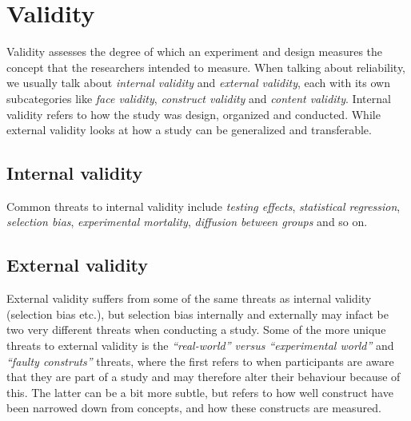 \section{Validity}
	Validity assesses the degree of which an experiment and design measures the concept that the researchers intended to measure.
	When talking about reliability, we usually talk about \textit{internal validity} and \textit{external validity}, each with its own subcategories like \textit{face validity}, \textit{construct validity} and \textit{content validity}.
	Internal validity refers to how the study was design, organized and conducted. While external validity looks at how a study can be generalized and transferable.
	
	\subsection{Internal validity}
	Common threats to internal validity include \textit{testing effects}, \textit{statistical regression}, \textit{selection bias}, \textit{experimental mortality}, \textit{diffusion between groups} and so on. 
	
	\subsection{External validity}
	External validity suffers from some of the same threats as internal validity (selection bias etc.), but selection bias internally and externally may infact be two very different threats when conducting a study.
	Some of the more unique threats to external validity is the \textit{"`real-world"' versus "`experimental world"'} and \textit{"`faulty construts"'} threats, where the first refers to when participants are aware that they are part of a study and may therefore alter their behaviour because of this. The latter can be a bit more subtle, but refers to how well construct have been narrowed down from concepts, and how these constructs are measured.
